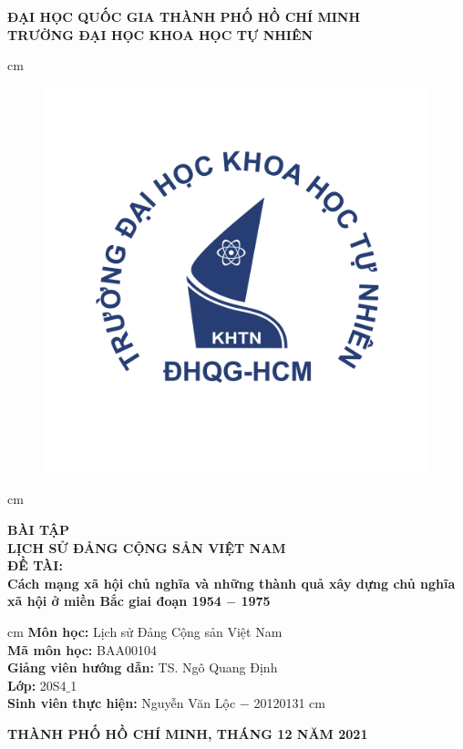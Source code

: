 \begin{titlepage}
\begin{mybox}
\begin{center}
\fontsize{12}{12}\selectfont
\textbf{ĐẠI HỌC QUỐC GIA THÀNH PHỐ HỒ CHÍ MINH}\\
\textbf{TRƯỜNG ĐẠI HỌC KHOA HỌC TỰ NHIÊN}
\end{center}
 cm
\begin{figure}[H]
\begin{center}
\includegraphics[scale=0.25]{figures/logo_hcmus}
\end{center}
\end{figure}
 cm
\begin{center}
\fontsize{18}{14}\selectfont
\textbf{BÀI TẬP}\\
\fontsize{22}{16}\selectfont
\textbf{LỊCH SỬ ĐẢNG CỘNG SẢN VIỆT NAM}\\
\fontsize{18}{12}\selectfont
\textbf{ĐỀ TÀI: }\\
\textbf{Cách mạng xã hội chủ nghĩa và những thành quả xây dựng chủ nghĩa xã hội ở miền Bắc giai đoạn 1954 $-$ 1975}
\end{center}
 cm
\fontsize{14}{12}\selectfont
\textbf{Môn học:} Lịch sử Đảng Cộng sản Việt Nam\\
\textbf{Mã môn học:} BAA00104\\
\textbf{Giảng viên hướng dẫn:} TS. Ngô Quang Định\\
\textbf{Lớp:} 20S4$\_$1\\
\textbf{Sinh viên thực hiện:} Nguyễn Văn Lộc $-$ 20120131
 cm
\begin{center}
\textbf{THÀNH PHỐ HỒ CHÍ MINH, THÁNG 12 NĂM 2021}
\end{center}
\end{mybox}
\end{titlepage}